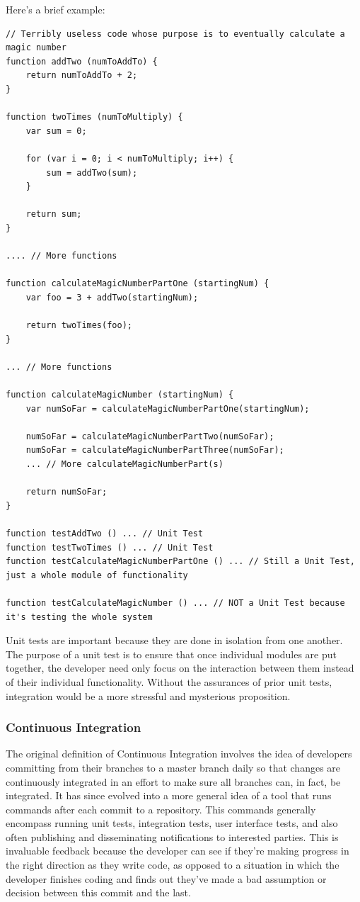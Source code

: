 \documentclass[11pt]{article}
\begin{document}
Here's a brief example:
\begin{lstlisting}
// Terribly useless code whose purpose is to eventually calculate a magic number
function addTwo (numToAddTo) {
	return numToAddTo + 2;
}

function twoTimes (numToMultiply) {
	var sum = 0;

	for (var i = 0; i < numToMultiply; i++) {
		sum = addTwo(sum);
	}

	return sum;
}

.... // More functions

function calculateMagicNumberPartOne (startingNum) {
	var foo = 3 + addTwo(startingNum);

	return twoTimes(foo);
}

... // More functions

function calculateMagicNumber (startingNum) {
	var numSoFar = calculateMagicNumberPartOne(startingNum);

	numSoFar = calculateMagicNumberPartTwo(numSoFar);
	numSoFar = calculateMagicNumberPartThree(numSoFar);
	... // More calculateMagicNumberPart(s)

	return numSoFar;
}

function testAddTwo () ... // Unit Test
function testTwoTimes () ... // Unit Test
function testCalculateMagicNumberPartOne () ... // Still a Unit Test, just a whole module of functionality

function testCalculateMagicNumber () ... // NOT a Unit Test because it's testing the whole system
\end{lstlisting}

Unit tests are important because they are done in isolation from one another. The purpose of a unit test is to ensure that once individual modules are put together, the developer need only focus on the interaction between them instead of their individual functionality. Without the assurances of prior unit tests, integration would be a more stressful and mysterious proposition.

\subsubsection{Continuous Integration}
The original definition of Continuous Integration involves the idea of developers committing from their  branches to a master branch daily so that changes are continuously integrated in an effort to make sure all branches can, in fact, be integrated. It has since evolved into a more general idea of a tool that runs commands after each commit to a repository. This commands generally encompass running unit tests, integration tests, user interface tests, and also often publishing and disseminating notifications to interested parties. This is invaluable feedback because the developer can see if they're making progress in the right direction as they write code, as opposed to a situation in which the developer finishes coding and finds out they've made a bad assumption or decision between this commit and the last. 
\end{document}

